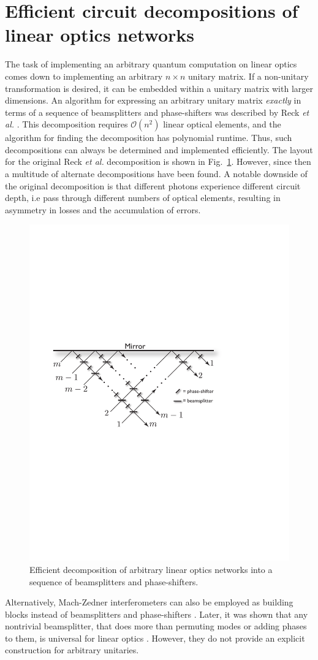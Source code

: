 \documentclass[times,final]{elsarticle}
\begin{document}
\section{Efficient circuit decompositions of linear optics networks}\label{sec:decomp}

The task of implementing an arbitrary quantum computation on linear optics comes down to implementing an arbitrary $n\times n$ unitary matrix. If a non-unitary transformation is desired, it can be embedded within a unitary matrix with larger dimensions. An algorithm for expressing an arbitrary unitary matrix {\it exactly} in terms of a sequence of beamsplitters and phase-shifters was described by Reck \emph{et al.} \cite{bib:Reck1994}. This decomposition requires $\mathcal{O}(n^2)$ linear optical elements, and the algorithm for finding the decomposition has polynomial runtime. Thus, such decompositions can always be determined and implemented efficiently. The layout for the original Reck \emph{et al.} decomposition is shown in Fig.~\ref{fig:Reck}. However, since then a multitude of alternate decompositions have been found. A notable downside of the original decomposition is that different photons experience different circuit depth, i.e pass through different numbers of optical elements, resulting in asymmetry in losses and the accumulation of errors.

\begin{figure}[!htb]
\centering
\includegraphics[width=0.4\columnwidth]{reck}
\caption{Efficient decomposition of arbitrary linear optics networks into a sequence of beamsplitters and phase-shifters.} \label{fig:Reck}	
\end{figure}

Alternatively, Mach-Zedner interferometers can also be employed as building blocks instead of beamsplitters and phase-shifters \cite{bib:Englert2001}. Later, it was shown that any nontrivial beamsplitter, that does more than permuting modes or adding phases to them, is universal for linear optics \cite{bib:Bouland2014}. However, they do not provide an explicit construction for arbitrary unitaries.
\end{document}
